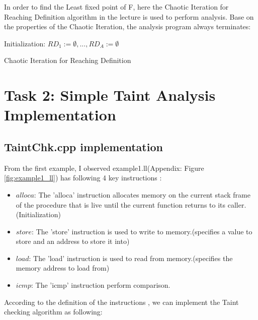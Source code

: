 \documentclass[english,12pt]{article}
\begin{document}
	In order to find the Least fixed point of F, here the Chaotic Iteration for Reaching Definition algorithm in the lecture is used to perform analysis. Base on the properties of the Chaotic Iteration, the analysis program always terminates:
	
	\begin{algorithm}[H]
		\SetAlgoLined
		Initialization: $RD_1:=\emptyset , ... , RD_A:=\emptyset$\;
		
		\caption{Chaotic Iteration for Reaching Definition}
	\end{algorithm}
	
	\section{Task 2: Simple Taint Analysis Implementation} \label{sec:task2}
	\subsection{TaintChk.cpp implementation}
	From the first example, I observed example1.ll(Appendix: Figure \ref{fig:example1_ll}) has following 4 key instructions \cite{llvm}:
	\begin{itemize}
		\item $alloca$: The 'alloca' instruction allocates memory on the current stack frame of the procedure that is live until the current function returns to its caller. (Initialization)
		\item $store$: The 'store' instruction is used to write to memory.(specifies a value to store and an address to store it into)
		\item $load$: The 'load' instruction is used to read from memory.(specifies the memory address to load from)
		\item $icmp$: The 'icmp' instruction perform comparison.
	\end{itemize}
	According to the definition of the instructions \cite{llvm}, we can implement the Taint checking algorithm as following:
	
\end{document}
